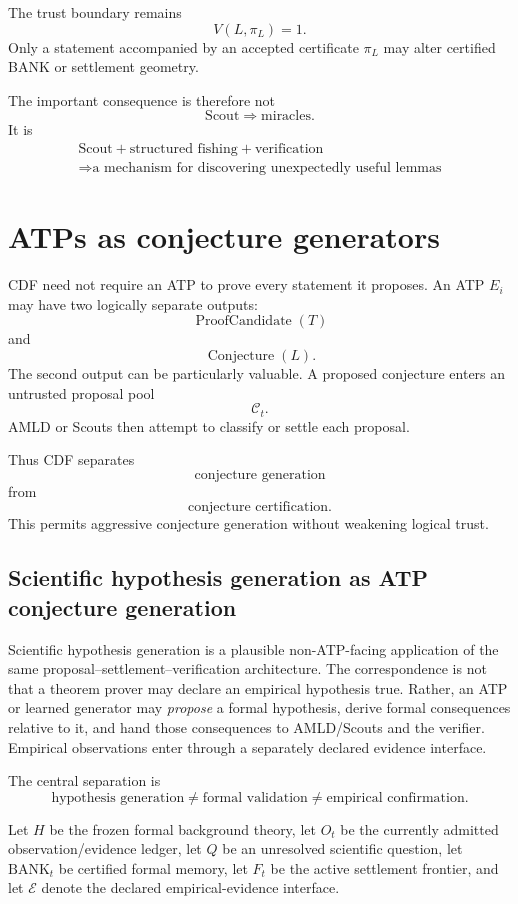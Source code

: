 \documentclass[11pt]{article}
\theoremstyle{definition}
\newcommand{\BANK}{\mathrm{BANK}}
\begin{document}
The trust boundary remains
\[
V(L,\pi_L)=1.
\]
Only a statement accompanied by an accepted certificate $\pi_L$ may alter certified BANK or settlement geometry.

The important consequence is therefore not
\[
\text{Scout}\Rightarrow\text{miracles}.
\]
It is
\[
\boxed{\begin{gathered}
\text{Scout}+\text{structured fishing}+\text{verification}\\
\Rightarrow\text{a mechanism for discovering unexpectedly useful lemmas}
\end{gathered}}
\]

\section{ATPs as conjecture generators}

CDF need not require an ATP to prove every statement it proposes. An ATP $E_i$ may have two logically separate outputs:
\[
\operatorname{ProofCandidate}(T)
\]
and
\[
\operatorname{Conjecture}(L).
\]
The second output can be particularly valuable. A proposed conjecture enters an untrusted proposal pool
\[
\mathcal C_t.
\]
AMLD or Scouts then attempt to classify or settle each proposal.

Thus CDF separates
\[
\boxed{\text{conjecture generation}}
\]
from
\[
\boxed{\text{conjecture certification}.}
\]
This permits aggressive conjecture generation without weakening logical trust.

\subsection{Scientific hypothesis generation as ATP conjecture generation}

Scientific hypothesis generation is a plausible non-ATP-facing application of the same proposal--settlement--verification architecture. The correspondence is not that a theorem prover may declare an empirical hypothesis true. Rather, an ATP or learned generator may \emph{propose} a formal hypothesis, derive formal consequences relative to it, and hand those consequences to AMLD/Scouts and the verifier. Empirical observations enter through a separately declared evidence interface.

The central separation is
\[
\boxed{
\text{hypothesis generation}
\neq
\text{formal validation}
\neq
\text{empirical confirmation}.
}
\]

Let $H$ be the frozen formal background theory, let $O_t$ be the currently admitted observation/evidence ledger, let $Q$ be an unresolved scientific question, let $\BANK_t$ be certified formal memory, let $F_t$ be the active settlement frontier, and let $\mathcal E$ denote the declared empirical-evidence interface.
\end{document}
